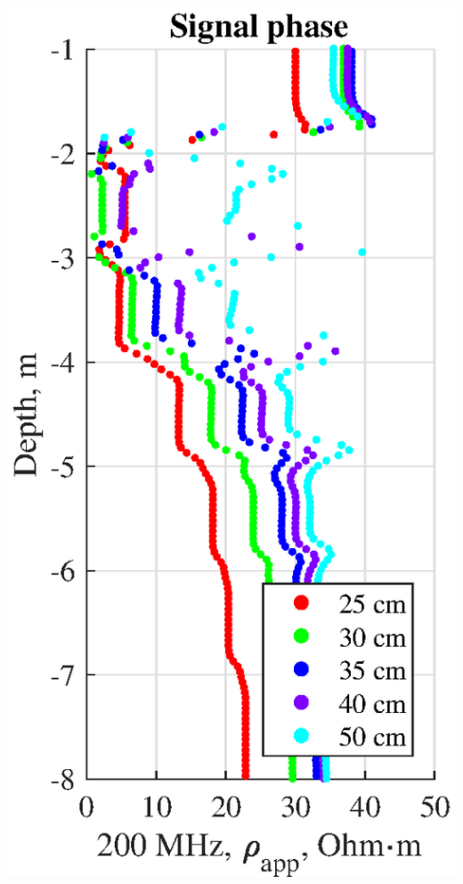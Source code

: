 \documentclass[aspectratio=169]{beamer}
\begin{document}
\begin{frame}
\begin{columns}[c]
\includegraphics[scale=0.44]{cement_solid_logg_rapp_phs.eps}



\end{columns}
\end{frame}
\end{document}
